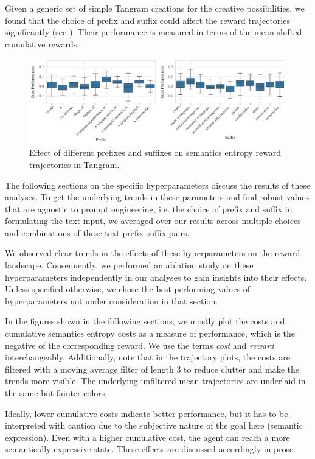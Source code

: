 Given a generic set of simple Tangram creations for the creative possibilities, we found that the choice of prefix and suffix could affect the reward trajectories significantly (see ).
Their performance is measured in terms of the mean-shifted cumulative rewards.

\begin{figure}[h]
    \centering
    \includegraphics[width=\textwidth]{images/prefix-suffix.pdf}
    \caption{Effect of different prefixes and suffixes on semantics entropy reward trajectories in Tangram.}
    \label{fig:prefix-suffix}
\end{figure}
\vspace{-7pt}
The following sections on the specific hyperparameters discuss the results of these analyses.
To get the underlying trends in these parameters and find robust values that are agnostic to prompt engineering, i.e. the choice of prefix and suffix in formulating the text input, we averaged over our results across multiple choices and combinations of these text prefix-suffix pairs.

We observed clear trends in the effects of these hyperparameters on the reward landscape.
Consequently, we performed an ablation study on these hyperparameters independently in our analyses to gain insights into their effects.
Unless specified otherwise, we chose the best-performing values of hyperparameters not under consideration in that section.

In the figures shown in the following sections, we mostly plot the costs and cumulative semantics entropy costs as a measure of performance, which is the negative of the corresponding reward.
We use the terms \emph{cost} and \emph{reward} interchangeably.
Additionally, note that in the trajectory plots, the costs are filtered with a moving average filter of length \(3\) to reduce clutter and make the trends more visible.
The underlying unfiltered mean trajectories are underlaid in the same but fainter colors.

Ideally, lower cumulative costs indicate better performance, but it has to be interpreted with caution due to the subjective nature of the goal here (semantic expression). Even with a higher cumulative cost, the agent can reach a more semantically expressive state.
These effects are discussed accordingly in prose.


